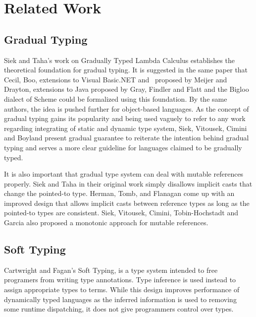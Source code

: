 \section{Related Work}

\subsection{Gradual Typing}
Siek and Taha's work on Gradually Typed Lambda Calculus\cite{siek2006gradual}
establishes the theoretical foundation for gradual typing.
It is suggested in the same paper that Cecil\cite{chambers2004cecil}, Boo\cite{de2005boo},
extensions to Visual Basic.NET and \csharp\ proposed by Meijer and Drayton\cite{meijer2004static},
extensions to Java proposed by Gray, Findler and Flatt\cite{gray2005fine}
and the Bigloo \cite{bres2004compiling,serrano2002bigloo} dialect of Scheme\cite{abelson1998revised}
could be formalized using this foundation.
By the same authors,
the idea is pushed further for object-based languages\cite{siek2007gradual}.
As the concept of gradual typing gains its popularity and being used vaguely to
refer to any work regarding integrating of static and dynamic type system,
Siek, Vitousek, Cimini and Boyland present gradual guarantee\cite{siek2015refined}
to reiterate the intention behind gradual typing and serves a more clear guideline for
languages claimed to be gradually typed.

It is also important that gradual type system can deal with
mutable references properly.
Siek and Taha\cite{siek2006gradual} in their original work
simply disallows implicit casts that change the pointed-to type.
Herman, Tomb, and Flanagan\cite{herman2010space} come up with
an improved design that allows implicit casts between reference types
as long as the pointed-to types are consistent.
Siek, Vitousek, Cimini, Tobin-Hochstadt and Garcia\cite{siek2015monotonic}
also proposed a monotonic approach for mutable references.

\subsection{Soft Typing}
Cartwright and Fagan's Soft Typing\cite{cartwright1991soft},
is a type system intended to free programers from writing type annotations.
Type inference is used instead to assign appropriate types to terms.
While this design improves performance of dynamically typed languages
as the inferred information is used to removing some runtime dispatching,
it does not give programmers control over types.

